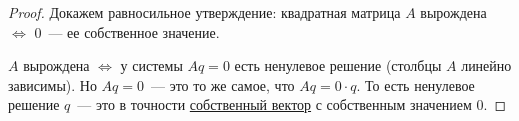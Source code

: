 

\begin{proof}
  Докажем равносильное утверждение: квадратная матрица $A$ вырождена $\Leftrightarrow$ $0$~--- ее собственное значение.

  $A$ вырождена $\Leftrightarrow$ у системы $Aq = 0$ есть ненулевое решение (столбцы $A$ линейно зависимы).
  Но $Aq = 0$~--- это то же самое, что $Aq = 0 \cdot q$. То есть ненулевое решение $q$~--- это в точности \hyperref[note:57D369D6-D748-41A2-9BDA-38D2FFC6601A]{собственный вектор} с собственным значением $0$.
\end{proof}
